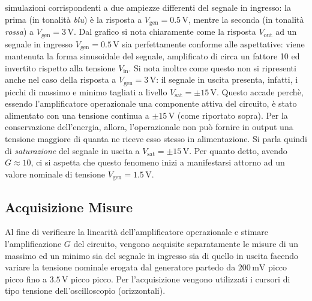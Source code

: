\documentclass[a4paper,11pt]{article} %
\begin{document}
\noindent simulazioni corrispondenti a due ampiezze differenti del segnale in ingresso: la prima (in tonalità
\textit{blu}) è la risposta a $V_{\text{gen}}=0.5\,\si{\volt}$, mentre la seconda (in tonalità \textit{rossa}) a
$V_{\text{gen}}=3\,\si{\volt}$. Dal grafico si nota chiaramente come la risposta $V_{\text{out}}$ ad un segnale in
ingresso $V_{\text{gen}}=0.5\,\si{\volt}$ sia perfettamente conforme alle aspettative: viene mantenuta la forma
sinusoidale del segnale, amplificato di circa un fattore 10 ed invertito rispetto alla tensione $V_{\text{in}}$. Si nota
inoltre come questo non si ripresenti anche nel caso della risposta a $V_{\text{gen}}=3\,\si{\volt}$: il segnale in
uscita presenta, infatti, i picchi di massimo e minimo tagliati a livello $V_{\text{sat}}=\pm 15\,\si{\volt}$. Questo
accade perchè, essendo l'amplificatore operazionale una componente attiva del circuito, è stato alimentato con una
tensione continua a $\pm 15\,\si{\volt}$ (come riportato sopra). Per la conservazione dell'energia, allora, l'operazionale
non può fornire in output una tensione maggiore di quanta ne riceve esso stesso in alimentazione. Si parla quindi di
\textit{saturazione} del segnale in uscita a $V_{\text{sat}}=\pm 15\,\si{\volt}$. Per quanto detto,  avendo $G \approx
10$, ci si aspetta che questo fenomeno inizi a manifestarsi attorno ad un valore nominale di tensione
$V_{\text{gen}}=1.5\,\si{\volt}$.



\subsection{Acquisizione Misure}

Al fine di verificare la linearità dell'amplificatore operazionale e stimare l'amplificazione $G$ del circuito, vengono
acquisite separatamente le misure di un massimo ed un minimo sia del segnale in ingresso sia di quello in uscita facendo
variare la tensione nominale erogata dal generatore partedo da $200\,\si{\mV}$ picco picco fino a $3.5\,\si{\volt}$ picco
picco. Per l'acquisizione vengono utilizzati i cursori di tipo tensione dell'oscilloscopio (orizzontali). 


\end{document}
